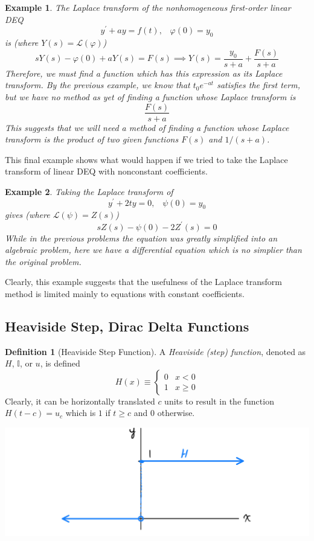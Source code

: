 \documentclass{article}
\newtheorem{example}{Example}[section]
\theoremstyle{remark}
\theoremstyle{definition}
\newtheorem{definition}{Definition}[section]
\begin{document}
\begin{example}
The Laplace transform of the nonhomogeneous first-order linear DEQ 
\[y^\prime + a y= f(t), \;\;\; \varphi(0) = y_0\]
is (where $Y(s) = \mathcal{L}(\varphi)$)
\[s Y(s) - \varphi(0) + a Y(s) = F(s) \implies Y(s) = \frac{y_0}{s+a} + \frac{F(s)}{s+a}\]
Therefore, we must find a function which has this expression as its Laplace transform. By the previous example, we know that $t_0 e^{-at}$ satisfies the first term, but we have no method as yet of finding a function whose Laplace transform is 
\[\frac{F(s)}{s+a}\]
This suggests that we will need a method of finding a function whose Laplace transform is the product of two given functions $F(s)$ and $1/(s+a)$. 
\end{example}

This final example shows what would happen if we tried to take the Laplace transform of linear DEQ with nonconstant coefficients. 

\begin{example}
Taking the Laplace transform of 
\[y^\prime + 2t y = 0, \;\;\; \psi(0) = y_0\]
gives (where $\mathcal{L}(\psi) = Z(s)$) 
\[sZ(s) - \psi(0) - 2Z^\prime (s) = 0\]
While in the previous problems the equation was greatly simplified into an algebraic problem, here we have a differential equation which is no simplier than the original problem. 
\end{example}

Clearly, this example suggests that the usefulness of the Laplace transform method is limited mainly to equations with constant coefficients. 

\subsection{Heaviside Step, Dirac Delta Functions}
\begin{definition}[Heaviside Step Function]
A \textit{Heaviside (step) function}, denoted as $H$, $\mathbb{I}$, or $u$, is defined
\[H(x) \equiv \begin{cases}
0 & x < 0 \\
1  & x \geq 0
\end{cases}\]
Clearly, it can be horizontally translated $c$ units to result in the function $H(t-c) = u_c$ which is $1$ if $t \geq c$ and $0$ otherwise. 
\begin{center}
    \includegraphics[scale=0.23]{img/Heaviside.PNG}
\end{center}
\end{definition} 
\end{document}
